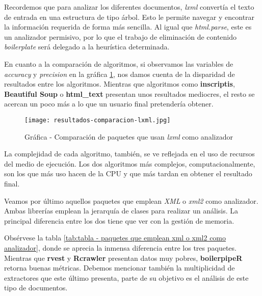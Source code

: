 Recordemos que para analizar los diferentes documentos, \emph{lxml} convertía el texto de entrada en una 
estructura de tipo árbol. Esto le permite navegar y encontrar la información requerida de forma más sencilla.
Al igual que \emph{html.parse}, este es un analizador permisivo, por lo que el trabajo de eliminación de 
contenido \emph{boilerplate} será delegado a la heurística determinada.

En cuanto a la comparación de algoritmos, si observamos las variables de \emph{accuracy} y \emph{precision}
en la gráfica \ref{img:grafica - comparacion de paquetes que usan lxml como analizador}, nos damos cuenta
de la disparidad de resultados entre los algoritmos. Mientras que algoritmos como \textbf{inscriptis},
\textbf{Beautiful Soup} o \textbf{html\_text} presentan unos resultados mediocres, el resto se acercan un 
poco más a lo que un usuario final pretendería obtener.

\begin{figure}[tphb]
    \centering
    \texttt{[image: resultados-comparacion-lxml.jpg]}
    \caption{Gráfica - Comparación de paquetes que usan \emph{lxml} como analizador}
    \label{img:grafica - comparacion de paquetes que usan lxml como analizador}
\end{figure}

La complejidad de cada algoritmo, también, se ve reflejada en el uso de recursos del medio de ejecución.
Los dos algoritmos más complejos, computacionalmente, son los que más uso hacen de la CPU y que más tardan
en obtener el resultado final.

Veamos por último aquellos paquetes que emplean \emph{XML} o \emph{xml2} como analizador. Ambas librerías
emplean la jerarquía de clases para realizar un análisis. La principal diferencia entre los dos tiene que
ver con la gestión de memoria.

Obsérvese la tabla \ref{tab:tabla - paquetes que emplean xml o xml2 como analizador}, donde se aprecia la
inmensa diferencia entre los tres paquetes. Mientras que \textbf{rvest} y \textbf{Rcrawler} presentan datos
muy pobres, \textbf{boilerpipeR} retorna buenas métricas. Debemos mencionar también la multiplicidad de
extractores que este último presenta, parte de su objetivo es el análisis de este tipo de documentos.

